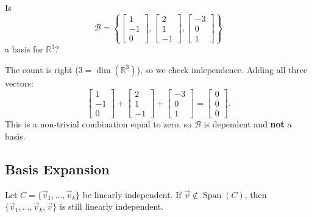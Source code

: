 \begin{example}
Is
\[
\mathcal{B} = \left\{ \begin{bmatrix} 1 \\ -1 \\ 0 \end{bmatrix}, \begin{bmatrix} 2 \\ 1 \\ -1 \end{bmatrix}, \begin{bmatrix} -3 \\ 0 \\ 1 \end{bmatrix} \right\}
\]
a basis for $\mathbb{R}^3$?

\begin{solution}
The count is right ($3 = \dim(\mathbb{R}^3)$), so we check independence. Adding all three vectors:
\[
\begin{bmatrix} 1 \\ -1 \\ 0 \end{bmatrix} + \begin{bmatrix} 2 \\ 1 \\ -1 \end{bmatrix} + \begin{bmatrix} -3 \\ 0 \\ 1 \end{bmatrix} = \begin{bmatrix} 0 \\ 0 \\ 0 \end{bmatrix}.
\]
This is a non-trivial combination equal to zero, so $\mathcal{B}$ is dependent and \textbf{not} a basis.
\end{solution}
\end{example}

\subsection{Basis Expansion}

\begin{lemma}\label{lem:L3-add}
Let $C = \{\vec{v}_1, \dots, \vec{v}_k\}$ be linearly independent. If $\vec{v} \notin \operatorname{Span}(C)$, then $\{\vec{v}_1, \dots, \vec{v}_k, \vec{v}\}$ is still linearly independent.
\end{lemma}

